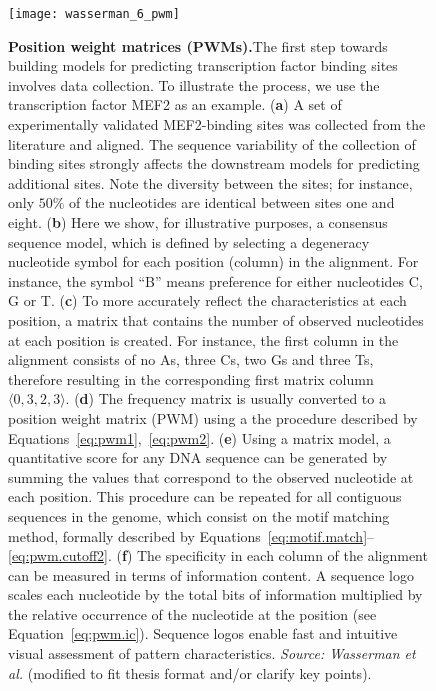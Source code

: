 \begin{figure}[h!]
\centering
\texttt{[image: wasserman\_6\_pwm]}
\caption[Position weight matrices (PWMs)]{\textbf{Position weight matrices (PWMs).}The first step towards building models for predicting transcription factor binding sites involves data collection. To illustrate the process, we use the transcription factor MEF2 as an example. (\textbf{a}) A set of experimentally validated MEF2-binding sites was collected from the literature and aligned. The sequence variability of the collection of binding sites strongly affects the downstream models for predicting additional sites. Note the diversity between the sites; for instance, only $50\%$ of the nucleotides are identical between sites one and eight. (\textbf{b}) Here we show, for illustrative purposes, a consensus sequence model, which is defined by selecting a degeneracy nucleotide symbol for each position (column) in the alignment. For instance, the symbol ``B'' means preference for either nucleotides C, G or T. (\textbf{c}) To more accurately reflect the characteristics at each position, a matrix that contains the number of observed nucleotides at each position is created. For instance, the first column in the alignment consists of no As, three Cs, two Gs and three Ts, therefore resulting in the corresponding first matrix column $\langle 0, 3, 2, 3 \rangle$. (\textbf{d}) The frequency matrix is usually converted to a position weight matrix (PWM) using a the procedure described by Equations~\ref{eq:pwm1},~\ref{eq:pwm2}. (\textbf{e}) Using a matrix model, a quantitative score for any DNA sequence can be generated by summing the values that correspond to the observed nucleotide at each position. This procedure can be repeated for all contiguous sequences in the genome, which consist on the motif matching method, formally described by Equations~\ref{eq:motif.match}--\ref{eq:pwm.cutoff2}. (\textbf{f}) The specificity in each column of the alignment can be measured in terms of information content. A sequence logo scales each nucleotide by the total bits of information multiplied by the relative occurrence of the nucleotide at the position (see Equation~\ref{eq:pwm.ic}). Sequence logos enable fast and intuitive visual assessment of pattern characteristics. \emph{Source: Wasserman et al.}\cite{wasserman2004} (modified to fit thesis format and/or clarify key points).}
\label{fig:wasserman_pwm}
\end{figure}

